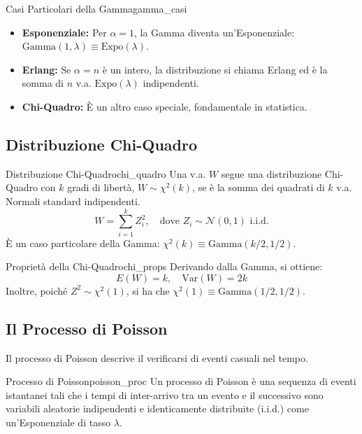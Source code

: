 \begin{nota}{Casi Particolari della Gamma}{gamma_casi}
\begin{itemize}
    \item \textbf{Esponenziale:} Per \(\alpha=1\), la Gamma diventa un'Esponenziale: \(\text{Gamma}(1, \lambda) \equiv \text{Expo}(\lambda)\).
    \item \textbf{Erlang:} Se \(\alpha=n\) è un intero, la distribuzione si chiama Erlang ed è la somma di \(n\) v.a. \(\text{Expo}(\lambda)\) indipendenti.
    \item \textbf{Chi-Quadro:} È un altro caso speciale, fondamentale in statistica.
\end{itemize}
\end{nota}

\subsection{Distribuzione Chi-Quadro}
\begin{definizione}{Distribuzione Chi-Quadro}{chi_quadro}
Una v.a. \(W\) segue una distribuzione Chi-Quadro con \(k\) gradi di libertà, \(W \sim \chi^2(k)\), se è la somma dei quadrati di \(k\) v.a. Normali standard indipendenti.
\[
W = \sum_{i=1}^k Z_i^2, \quad \text{dove } Z_i \sim \mathcal{N}(0,1) \text{ i.i.d.}
\]
È un caso particolare della Gamma: \( \chi^2(k) \equiv \text{Gamma}(k/2, 1/2) \).
\end{definizione}

\begin{nota}{Proprietà della Chi-Quadro}{chi_props}
Derivando dalla Gamma, si ottiene:
\[ E(W) = k, \quad \text{Var}(W) = 2k \]
Inoltre, poiché \( Z^2 \sim \chi^2(1) \), si ha che \(\chi^2(1) \equiv \text{Gamma}(1/2, 1/2)\).
\end{nota}

\subsection{Il Processo di Poisson}
Il processo di Poisson descrive il verificarsi di eventi casuali nel tempo.

\begin{definizione}{Processo di Poisson}{poisson_proc}
Un processo di Poisson è una sequenza di eventi istantanei tali che i tempi di inter-arrivo tra un evento e il successivo sono variabili aleatorie indipendenti e identicamente distribuite (i.i.d.) come un'Esponenziale di tasso \(\lambda\).
\end{definizione}

